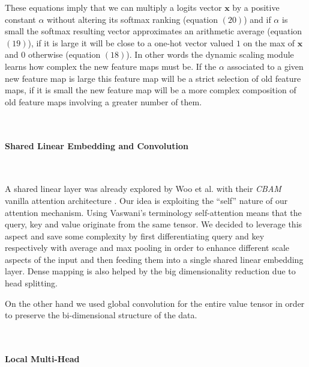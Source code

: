 \documentclass[fleqn,10pt]{SelfArx}
\begin{document}
These equations imply that we can multiply a logits vector $\mathbf{x}$ by a positive constant $\alpha$ without altering its softmax ranking (equation $(20)$) and if $\alpha$ is small the softmax resulting vector approximates an arithmetic average (equation $(19)$), if it is large it will be close to a one-hot vector valued $1$ on the max of $\mathbf{x}$ and $0$ otherwise (equation $(18)$).
In other words the dynamic scaling module learns how complex the new feature maps must be. If the $\alpha$ associated to a given new feature map is large this feature map will be a strict selection of old feature maps, if it is small the new feature map will be a more complex composition of old feature maps involving a greater number of them.

\

\paragraph{Shared Linear Embedding and Convolution}

\

A shared linear layer was already explored by Woo et al. with their \textit{CBAM} vanilla attention architecture \cite{woo2018cbam}. Our idea is exploiting the ``self'' nature of our attention mechanism. Using Vaswani's terminology self-attention means that the query, key and value originate from the same tensor. We decided to leverage this aspect and save some complexity by first differentiating query and key respectively with average and max pooling in order to enhance different scale aspects of the input and then feeding them into a single shared linear embedding layer. Dense mapping is also helped by the big dimensionality reduction due to head splitting.

On the other hand we used global convolution for the entire value tensor in order to preserve the bi-dimensional structure of the data. 

\

\paragraph{Local Multi-Head}

\
\end{document}
